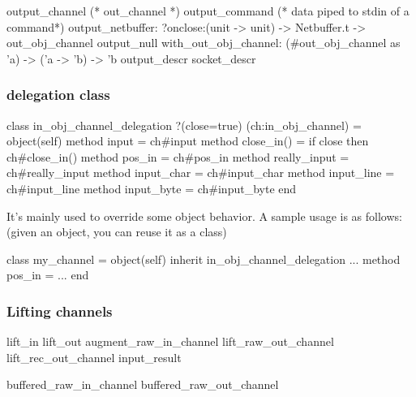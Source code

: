\begin{ocamlcode}
  output_channel
  (* out_channel *)
  output_command
  (* data piped to stdin of a command*)
  output_netbuffer:
  ?onclose:(unit -> unit) ->
  Netbuffer.t -> out_obj_channel
  output_null
  with_out_obj_channel:
  (#out_obj_channel as 'a) -> ('a -> 'b) -> 'b
  output_descr
  socket_descr 
\end{ocamlcode}

\subsubsection{delegation class}

\begin{ocamlcode}
  class in_obj_channel_delegation ?(close=true) (ch:in_obj_channel) =
  object(self)
    method input = ch#input
    method close_in() = if close then ch#close_in()
    method pos_in = ch#pos_in
    method really_input = ch#really_input
    method input_char = ch#input_char
    method input_line = ch#input_line
    method input_byte = ch#input_byte
  end
\end{ocamlcode}
It's mainly used to override some object behavior. A sample usage is
as follows: (given an object, you can reuse it as a class)

\begin{ocamlcode}
 class my_channel = object(self)
   inherit in_obj_channel_delegation ...
   method pos_in = ...
 end
\end{ocamlcode}

\subsubsection{Lifting channels}

\begin{ocamlcode}
  lift_in
  lift_out
  augment_raw_in_channel
  lift_raw_out_channel
  lift_rec_out_channel
  input_result

  buffered_raw_in_channel
  buffered_raw_out_channel
\end{ocamlcode}

